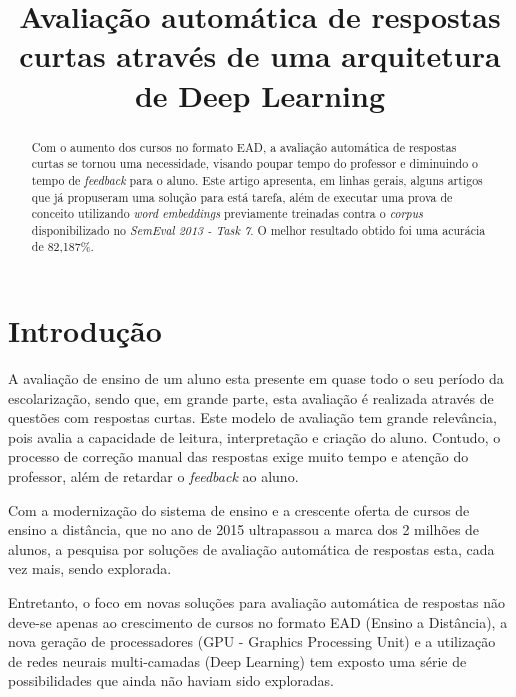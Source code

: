 \documentclass[conference]{IEEEtran}
\begin{document}
\title{Avaliação automática de respostas curtas através de uma arquitetura de Deep Learning}


\author{
}


\maketitle

\begin{abstract}
Com o aumento dos cursos no formato EAD, a avaliação automática de respostas curtas se tornou uma necessidade, visando poupar tempo do professor e diminuindo o tempo de \textit{feedback} para o aluno. Este artigo apresenta, em linhas gerais, alguns artigos que já propuseram uma solução para está tarefa, além de executar uma prova de conceito utilizando \textit{word embeddings} previamente treinadas contra o \textit{corpus} disponibilizado no \textit{SemEval 2013 - Task 7}. O melhor resultado obtido foi uma acurácia de 82,187\%.
\end{abstract}



\IEEEpeerreviewmaketitle



\section{Introdução}
A avaliação de ensino de um aluno esta presente em quase todo o seu período da escolarização, sendo que, em grande parte, esta avaliação é realizada através de questões com respostas curtas. Este modelo de avaliação tem grande relevância, pois avalia a capacidade de leitura, interpretação e criação do aluno. Contudo, o processo de correção manual das respostas exige muito tempo e atenção do professor, além de retardar o \textit{feedback} ao aluno\cite{Santos:2012}.

Com a modernização do sistema de ensino e a crescente oferta de cursos de ensino a distância, que no ano de 2015 ultrapassou a marca dos 2 milhões de alunos\cite{ABED:2015}, a pesquisa por soluções de avaliação automática de respostas esta, cada vez mais, sendo explorada.

Entretanto, o foco em novas soluções para avaliação automática de respostas não deve-se apenas ao crescimento de cursos no formato EAD (Ensino a Distância), a nova geração de processadores (GPU - Graphics Processing Unit) e a utilização de redes neurais multi-camadas (Deep Learning) tem exposto uma série de possibilidades que ainda não haviam sido exploradas.
\end{document}
